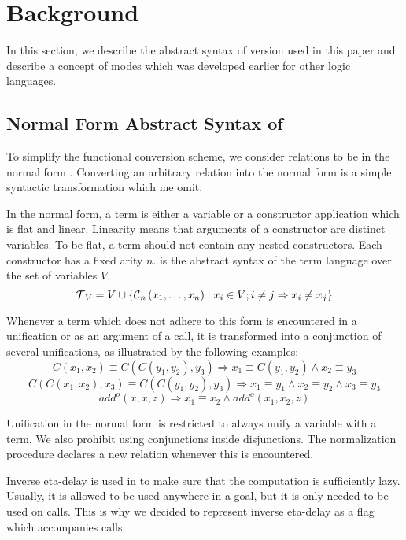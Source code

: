 \section{Background}

In this section, we describe the abstract syntax of \mk version used in this paper and describe a concept of modes which was developed earlier for other logic languages.

\subsection{Normal Form Abstract Syntax of \mk}

To simplify the functional conversion scheme, we consider \mk relations to be in the normal form .
Converting an arbitrary \mk relation into the normal form is a simple syntactic transformation which me omit.

In the normal form, a term is either a variable or a constructor application which is flat and linear.
Linearity means that arguments of a constructor are distinct variables.
To be flat, a term should not contain any nested constructors.
Each constructor has a fixed arity $n$.
 is the abstract syntax of the term language over the set of variables $V$.
\[  \operatorname{\mathcal{T}}_{V} = V \cup \{\operatorname{\mathcal{C}}_{n}\left( x_1, \ldots, x_{n} \right) \mid x_{i}\in V; i \neq j \Rightarrow x_i \neq x_j\} \]

Whenever a term which does not adhere to this form is encountered in a unification or as an argument of a call, it is transformed into a conjunction of several unifications, as illustrated by the following examples:
\[ C\left( x_1, x_2 \right) \equiv C\left( C\left( y_1, y_2 \right), y_3 \right) \Rightarrow x_1 \equiv C\left( y_1, y_2 \right) \land x_2 \equiv y_3   \]
\[ C\left( C\left( x_1, x_2 \right), x_3 \right) \equiv C\left( C\left( y_1, y_2 \right), y_3 \right) \Rightarrow x_1 \equiv y_1 \land x_2 \equiv y_2 \land x_3 \equiv y_3   \]
\[add^o\left( x, x, z \right) \Rightarrow x_1 \equiv x_2 \land add^o\left( x_1, x_2, z \right) \]

Unification in the normal form is restricted to always unify a variable with a term.
We also prohibit using conjunctions inside disjunctions.
The normalization procedure declares a new relation whenever this is encountered.

Inverse eta-delay is used in \mk to make sure that the computation is sufficiently lazy.
Usually, it is allowed to be used anywhere in a goal, but it is only needed to be used on calls.
This is why we decided to represent inverse eta-delay as a flag which accompanies calls.

